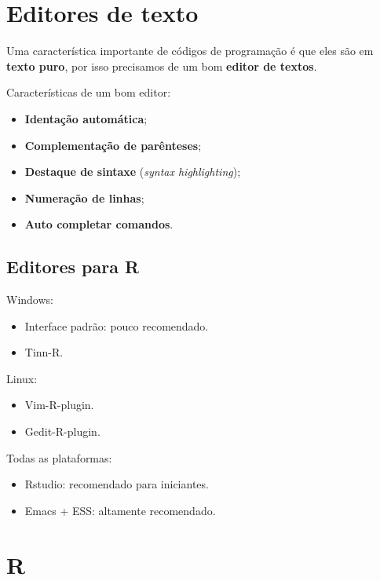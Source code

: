 \documentclass[10pt,a4paper]{book}
\providecommand{\tightlist}{%
  \setlength{\itemsep}{0pt}\setlength{\parskip}{0pt}}
\begin{document}
\section{Editores de texto}\label{editores-de-texto}

Uma característica importante de códigos de programação é que eles são
em \textbf{texto puro}, por isso precisamos de um bom \textbf{editor de
textos}.

Características de um bom editor:

\begin{itemize}
\tightlist
\item
  \textbf{Identação automática};
\item
  \textbf{Complementação de parênteses};
\item
  \textbf{Destaque de sintaxe} (\emph{syntax highlighting});
\item
  \textbf{Numeração de linhas};
\item
  \textbf{Auto completar comandos}.
\end{itemize}

\subsection{Editores para R}\label{editores-para-r}

Windows:

\begin{itemize}
\tightlist
\item
  Interface padrão: pouco recomendado.
\item
  Tinn-R.
\end{itemize}

Linux:

\begin{itemize}
\tightlist
\item
  Vim-R-plugin.
\item
  Gedit-R-plugin.
\end{itemize}

Todas as plataformas:

\begin{itemize}
\tightlist
\item
  Rstudio: recomendado para iniciantes.
\item
  Emacs + ESS: altamente recomendado.
\end{itemize}

\section{R}\label{r}
\end{document}
